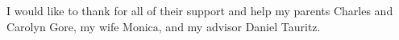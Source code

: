 
I would like to thank for all of their support and help my parents Charles and Carolyn Gore, my wife Monica, and my advisor Daniel Tauritz.

\begin{center}
   \Cross
\end{center}
